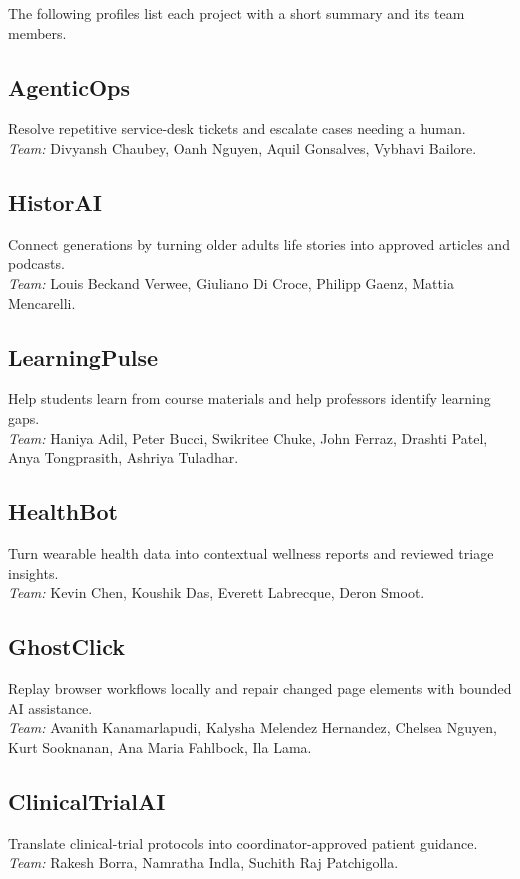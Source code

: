 \documentclass[sigconf,nonacm]{acmart}
\begin{document}
The following profiles list each project with a short summary and its team members.

\subsection*{AgenticOps}
Resolve repetitive service-desk tickets and escalate cases needing a human.\\
\textit{Team:} Divyansh Chaubey, Oanh Nguyen, Aquil Gonsalves, Vybhavi Bailore.

\subsection*{HistorAI}
Connect generations by turning older adults life stories into approved articles and podcasts.\\
\textit{Team:} Louis Beckand Verwee, Giuliano Di Croce, Philipp Gaenz, Mattia Mencarelli.

\subsection*{LearningPulse}
Help students learn from course materials and help professors identify learning gaps.\\
\textit{Team:} Haniya Adil, Peter Bucci, Swikritee Chuke, John Ferraz, Drashti Patel, Anya Tongprasith, Ashriya Tuladhar.

\subsection*{HealthBot}
Turn wearable health data into contextual wellness reports and reviewed triage insights.\\
\textit{Team:} Kevin Chen, Koushik Das, Everett Labrecque, Deron Smoot.

\subsection*{GhostClick}
Replay browser workflows locally and repair changed page elements with bounded AI assistance.\\
\textit{Team:} Avanith Kanamarlapudi, Kalysha Melendez Hernandez, Chelsea Nguyen, Kurt Sooknanan, Ana Maria Fahlbock, Ila Lama.

\subsection*{ClinicalTrialAI}
Translate clinical-trial protocols into coordinator-approved patient guidance.\\
\textit{Team:} Rakesh Borra, Namratha Indla, Suchith Raj Patchigolla.
\end{document}
